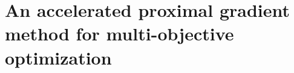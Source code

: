 \documentclass[../main]{subfiles}
\begin{document}
\chapter{An accelerated proximal gradient method for multi-objective optimization} \label{sec:acc_pgm}












\end{document}
